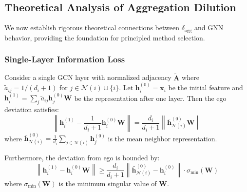 \subsection{Theoretical Analysis of Aggregation Dilution}
\label{sec:dilution_theory}

We now establish rigorous theoretical connections between $\delta_{\text{agg}}$ and GNN behavior, providing the foundation for principled method selection.

\subsubsection{Single-Layer Information Loss}

\begin{theorem}
\label{thm:single_layer}
Consider a single GCN layer with normalized adjacency $\tilde{\mathbf{A}}$ where $\tilde{a}_{ij} = 1/(d_i+1)$ for $j \in \mathcal{N}(i) \cup \{i\}$. Let $\mathbf{h}_i^{(0)} = \mathbf{x}_i$ be the initial feature and $\mathbf{h}_i^{(1)} = \sum_j \tilde{a}_{ij} \mathbf{h}_j^{(0)} \mathbf{W}$ be the representation after one layer. Then the ego deviation satisfies:
\begin{equation}
\left\| \mathbf{h}_i^{(1)} - \frac{1}{d_i+1}\mathbf{h}_i^{(0)}\mathbf{W} \right\| = \frac{d_i}{d_i+1} \left\| \bar{\mathbf{h}}_{\mathcal{N}(i)}^{(0)} \mathbf{W} \right\|
\end{equation}
where $\bar{\mathbf{h}}_{\mathcal{N}(i)}^{(0)} = \frac{1}{d_i}\sum_{j \in \mathcal{N}(i)} \mathbf{h}_j^{(0)}$ is the mean neighbor representation.

Furthermore, the deviation from ego is bounded by:
\begin{equation}
\left\| \mathbf{h}_i^{(1)} - \mathbf{h}_i^{(0)}\mathbf{W} \right\| \geq \frac{d_i}{d_i+1} \left\| \bar{\mathbf{h}}_{\mathcal{N}(i)}^{(0)} - \mathbf{h}_i^{(0)} \right\| \cdot \sigma_{\min}(\mathbf{W})
\end{equation}
where $\sigma_{\min}(\mathbf{W})$ is the minimum singular value of $\mathbf{W}$.
\end{theorem}

